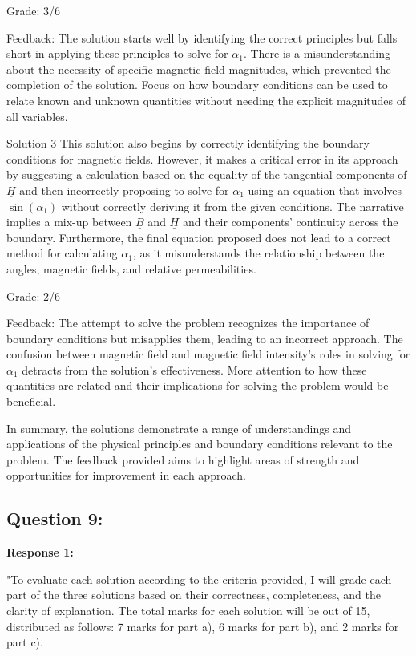 \documentclass[a4paper,11pt]{article}
\begin{document}
Grade: 3/6

Feedback: The solution starts well by identifying the correct principles but falls short in applying these principles to solve for \( \alpha_1 \). There is a misunderstanding about the necessity of specific magnetic field magnitudes, which prevented the completion of the solution. Focus on how boundary conditions can be used to relate known and unknown quantities without needing the explicit magnitudes of all variables.

Solution 3
This solution also begins by correctly identifying the boundary conditions for magnetic fields. However, it makes a critical error in its approach by suggesting a calculation based on the equality of the tangential components of
\( \underline{H} \) and then incorrectly proposing to solve for \( \alpha_1 \) using an equation that involves \( \sin(\alpha_1) \) without correctly deriving it from the given conditions. The narrative implies a mix-up between
\( \underline{B} \) and \( \underline{H} \) and their components' continuity across the boundary. Furthermore, the final equation proposed does not lead to a correct method for calculating \( \alpha_1 \), as it misunderstands the relationship between the angles, magnetic fields, and relative permeabilities.

Grade: 2/6

Feedback: The attempt to solve the problem recognizes the importance of boundary conditions but misapplies them, leading to an incorrect approach. The confusion between magnetic field and magnetic field intensity's roles in solving for \( \alpha_1 \) detracts from the solution's effectiveness. More attention to how these quantities are related and their implications for solving the problem would be beneficial.

In summary, the solutions demonstrate a range of understandings and applications of the physical principles and boundary conditions relevant to the problem. The feedback provided aims to highlight areas of strength and opportunities for improvement in each approach.

\subsection*{Question 9:}

\textbf{Response 1:}

"To evaluate each solution according to the criteria provided, I will grade each part of the three solutions based on their correctness, completeness, and the clarity of explanation. The total marks for each solution will be out of 15, distributed as follows: 7 marks for part a), 6 marks for part b), and 2 marks for part c). 
\end{document}
